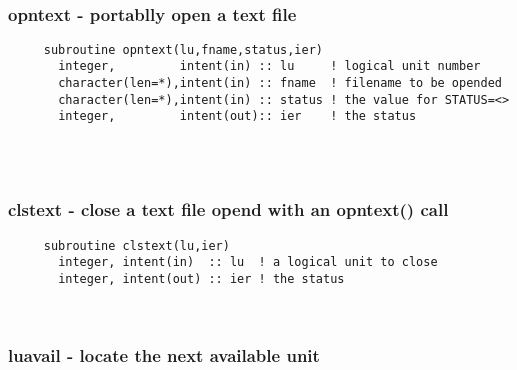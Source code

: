  
\mbox{}\hrulefill\ 
 
  \subsubsection{opntext - portablly open a text file}

%  
\begin{verbatim} 
     subroutine opntext(lu,fname,status,ier)
       integer,         intent(in) :: lu     ! logical unit number
       character(len=*),intent(in) :: fname  ! filename to be opended
       character(len=*),intent(in) :: status ! the value for STATUS=<>
       integer,         intent(out):: ier    ! the status
 
 \end{verbatim}%
 
 
\mbox{}\hrulefill\ 
 
  \subsubsection{clstext - close a text file opend with an opntext() call}

\begin{verbatim} 
     subroutine clstext(lu,ier)
       integer, intent(in)  :: lu  ! a logical unit to close
       integer, intent(out) :: ier ! the status
 \end{verbatim}%
 
 
\mbox{}\hrulefill\ 

  \subsubsection{luavail - locate the next available unit}


